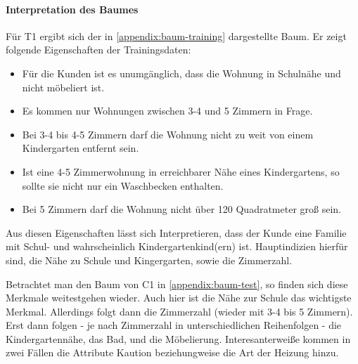 \paragraph{Interpretation des Baumes}
Für T1 ergibt sich der in \autoref{appendix:baum-training} dargestellte Baum.
Er zeigt folgende Eigenschaften der Trainingsdaten:
\begin{itemize}
    \item Für die Kunden ist es unumgänglich, dass die Wohnung in Schulnähe und nicht möbeliert ist.
    \item Es kommen nur Wohnungen zwischen 3-4 und 5 Zimmern in Frage.
    \item Bei 3-4 bis 4-5 Zimmern darf die Wohnung nicht zu weit von einem Kindergarten entfernt sein.
    \item Ist eine 4-5 Zimmerwohnung in erreichbarer Nähe eines Kindergartens, so sollte sie nicht nur ein Waschbecken enthalten.
    \item Bei 5 Zimmern darf die Wohnung nicht über 120 Quadratmeter groß sein.
\end{itemize}

Aus diesen Eigenschaften lässt sich Interpretieren,
dass der Kunde eine Familie mit Schul- und wahrscheinlich Kindergartenkind(ern) ist.
Hauptindizien hierfür sind, die Nähe zu Schule und Kingergarten, sowie die Zimmerzahl.


Betrachtet man den Baum von C1 in \autoref{appendix:baum-test},
so finden sich diese Merkmale weitestgehen wieder.
Auch hier ist die Nähe zur Schule das wichtigste Merkmal.
Allerdings folgt dann die Zimmerzahl (wieder mit 3-4 bis 5 Zimmern).
Erst dann folgen - je nach Zimmerzahl in unterschiedlichen Reihenfolgen - die Kindergartennähe,
das Bad, und die Möbelierung.
Interesanterweiße kommen in zwei Fällen die Attribute Kaution beziehungweise die Art der Heizung hinzu.
